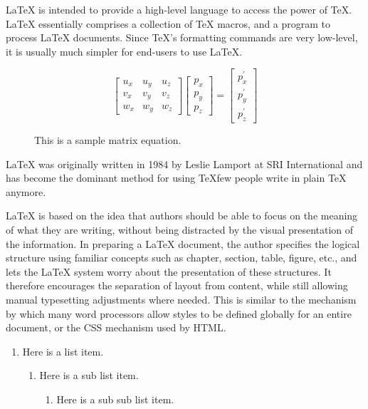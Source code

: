 LaTeX is intended to provide a high-level language to access the power of TeX. LaTeX essentially comprises a collection of TeX macros, and a program to process LaTeX documents. Since TeX's formatting commands are very low-level, it is usually much simpler for end-users to use LaTeX.

\begin{figure}
\begin{center}
\[
\left[\begin{array}{ccc}
u_{x} & u_{y} & u_{z}\\
v_{x} & v_{y} & v_{z}\\
w_{x} & w_{y} & w_{z}\end{array}\right]\left[\begin{array}{c}
p_{x}\\
p_{y}\\
p_{z}\end{array}\right]=\left[\begin{array}{c}
p_{x}^{\prime}\\
p_{y}^{\prime}\\
p_{z}^{\prime}\end{array}\right]\]
\captionfonts
\caption[A matrix equation]{This is a sample matrix equation.}
\label{eqn:example}
\end{center}
\end{figure}


LaTeX was originally written in 1984 by Leslie Lamport at SRI International and has become the dominant method for using TeXfew people write in plain TeX anymore.

LaTeX is based on the idea that authors should be able to focus on the meaning of what they are writing, without being distracted by the visual presentation of the information. In preparing a LaTeX document, the author specifies the logical structure using familiar concepts such as chapter, section, table, figure, etc., and lets the LaTeX system worry about the presentation of these structures. It therefore encourages the separation of layout from content, while still allowing manual typesetting adjustments where needed. This is similar to the mechanism by which many word processors allow styles to be defined globally for an entire document, or the CSS mechanism used by HTML.


\begin{enumerate}
\item Here is a list item.
\begin{enumerate}
\item Here is a sub list item.
\begin{enumerate}
\item Here is a sub sub list item.

\end{enumerate}
\end{enumerate}
\end{enumerate}

